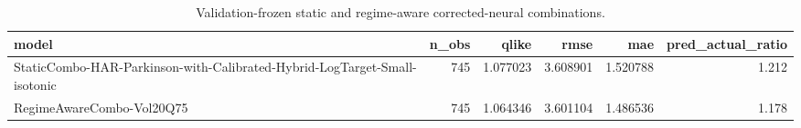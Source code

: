 \begin{table}[!t]
\centering
\caption{Validation-frozen static and regime-aware corrected-neural combinations.}
\label{tab:regime-aware-combination-results}
\scriptsize
\begin{tabular}{@{}lrrrrr@{}}
\toprule
model & n\_obs & qlike & rmse & mae & pred\_actual\_ratio \\
\midrule
StaticCombo-HAR-Parkinson-with-Calibrated-Hybrid-LogTarget-Small-isotonic & 745 & 1.077023 & 3.608901 & 1.520788 & 1.212 \\
RegimeAwareCombo-Vol20Q75 & 745 & 1.064346 & 3.601104 & 1.486536 & 1.178 \\
\bottomrule
\end{tabular}
\end{table}
